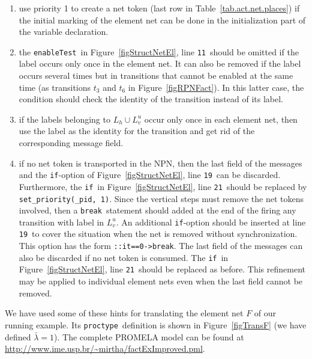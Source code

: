 \documentclass{llncs}
\begin{document}
\begin{enumerate}
\item use priority 1 to create a net token (last row in Table~\ref{tab.act.net.places}) if the initial marking of the element net  can be done in the initialization part of the variable declaration.
  \item the \small\verb"enableTest"\nfont\  in Figure~\ref{figStructNetEl}, line \small\verb"11"\nfont\  should be omitted if the label occurs only once in the element net. It can also be removed if the label occurs several times but in transitions that cannot be enabled at the same time (as transitions $t_3$ and $t_6$ in Figure~\ref{figRPNFact}). In this latter case, the condition should check the identity of the transition instead of its label.
  \item if the labels belonging to $L_h\cup L_v^u$ occur only once in each element net, then use the label as the identity for the transition and get rid of the corresponding message field.
  \item if no net token is transported in the NPN, then the last field of the messages and the \small\verb"if"\nfont-option of Figure~\ref{figStructNetEl}, line \small\verb"19"\nfont\   can be discarded. Furthermore, the \small\verb"if"\nfont\  in Figure~\ref{figStructNetEl}, line \small\verb"21"\nfont\ should be replaced by \small\verb"set_priority(_pid, 1)"\nfont. Since the vertical steps must remove the net tokens involved, then a \small\verb"break"\nfont\   statement should added at the end of the firing any transition with label in $L_v^u$. An  additional \small\verb"if"\nfont-option should be inserted at line \small\verb"19"\nfont\   to cover the situation when the net is removed without synchronization. This option has the form \small\verb"::it==0->break"\nfont.
      The last field of the messages can also be discarded if no net token is consumed. The \small\verb"if"\nfont\  in Figure~\ref{figStructNetEl}, line \small\verb"21"\nfont\ should be replaced as before. This refinement may be applied to individual element nets even when the last field cannot be removed.
\end{enumerate}


We have used some of these hints for translating the element net $F$ of our running example. Its \small\verb"proctype"\nfont\ definition is shown in Figure~\ref{figTransF} (we have defined $\bar{\lambda}=1$). The complete PROMELA model can be found at \small\url{http://www.ime.usp.br/~mirtha/factExImproved.pml}\nfont.
\end{document}
